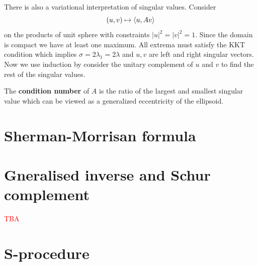\documentclass[a4paper]{mynotes}
\def\redd#1{\textcolor{red}{#1}}
\begin{document}
There is also a variational interpretation of singular values. Consider $$(u,v)\mapsto\left\langle u,Av\right\rangle$$ on the products of unit sphere with constraints $|u|^2=|v|^2=1$. Since the domain is compact we have at least one maximum. All extrema must satisfy the KKT condition 
which implies $\sigma=2\lambda_1=2\lambda$ and $u,v$ are left and right singular vectors. Now we use induction by consider the unitary complement of $u$ and $v$ to find the rest of the singular values.

The \textbf{condition number} of $A$ is the ratio of the largest and smallest singular value which can be viewed as a generalized eccentricity of the ellipsoid.

\section{
Sherman-Morrisan formula }

\section{Gneralised inverse and Schur complement}



\redd{TBA}
\section{S-procedure}
\end{document}
